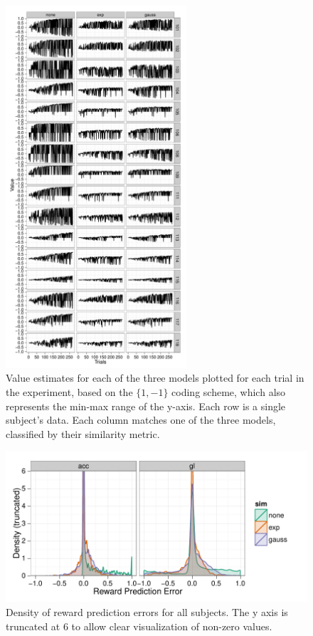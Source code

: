 \begin{figure}[tp]
    \includegraphics[width=0.6\textwidth]{f_value_gl}
    \centering
    \caption{Value estimates for each of the three models plotted for each trial in the experiment, based on the $\{1,-1\}$ coding scheme, which also represents the min-max range of the y-axis.   Each row is a single subject's data.  Each column matches one of the three models, classified by their similarity metric.}
    \label{fig:valuegl}
\end{figure}
\begin{figure}[tp]
    \includegraphics{f_density_rpe}
    \centering
    \caption{Density of reward prediction errors for all subjects.  The y axis is truncated at 6 to allow clear visualization of non-zero values.}
    \label{fig:denrpe}
\end{figure}

